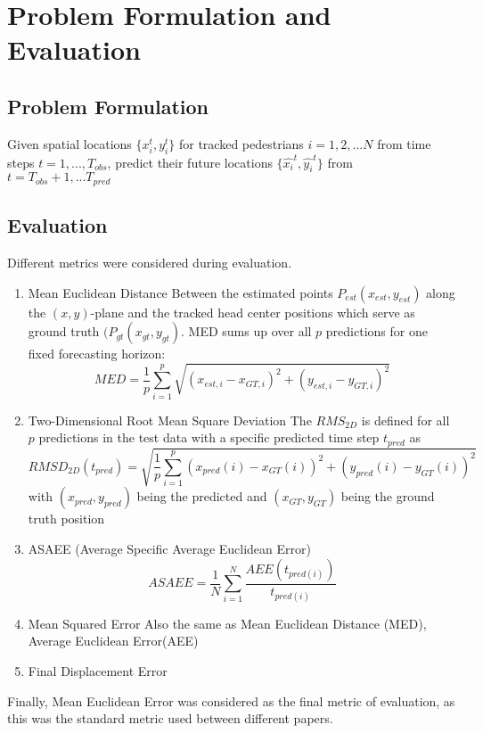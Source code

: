 \chapter{Problem Formulation and Evaluation}

\section{Problem Formulation}
Given spatial locations \( \{x_i^t, y_i^t\} \) for tracked pedestrians \(i = 1, 2, ... N\) from time steps \(t = 1, ..., T_{obs} \), predict their future locations \( \{\hat{x_i}^t, \hat{y_i}^t\} \) from \(t = T_{obs} + 1, ... T_{pred}\)

\section{Evaluation}
Different metrics were considered during evaluation. 
\begin{enumerate}
    
    \item Mean Euclidean Distance
    \cite{goldhammer_pedestrians_2014}
    Between the estimated points \( P_{est}(x_{est},y_{est})\) along the \((x,y)\)-plane and the tracked head center positions which serve as ground truth \((P_{gt}(x_{gt}, y_{gt})\). MED sums up over all \(p\) predictions for one fixed forecasting horizon:
    \[ MED = \frac{1}{p} \sum_{i=1}^{p} \sqrt{(x_{est,i}-x_{GT,i})^2 + (y_{est,i}-y_{GT,i})^2} \]
    
    \item Two-Dimensional Root Mean Square Deviation
    \cite{goldhammer_camera_2015}
    The \(RMS_{2D}\) is defined for all \(p\) predictions in the test data with a specific predicted time step \(t_{pred} \) as
    \[ RMSD_{2D}(t_{pred}) = \sqrt{\frac{1}{p}\sum_{i=1}^{p}(x_{pred}(i)-x_{GT}(i))^2+(y_{pred}(i)-y_{GT}(i))^2}\]
    with \((x_{pred},y_{pred})\) being the predicted and \((x_{GT},y_{GT})\) being the ground truth position
    \item ASAEE (Average Specific Average Euclidean Error) \cite{goldhammer_intentions_2018}
    \[ ASAEE = \frac{1}{N} \sum_{i=1}^{N} \frac{AEE(t_{pred(i)})}{t_{pred(i)}}  \]
    \item Mean Squared Error
    Also the same as Mean Euclidean Distance (MED), Average Euclidean Error(AEE)
    
    \item Final Displacement Error
\end{enumerate}


Finally, Mean Euclidean Error was considered as the final metric of evaluation, as this was the standard metric used between different papers.